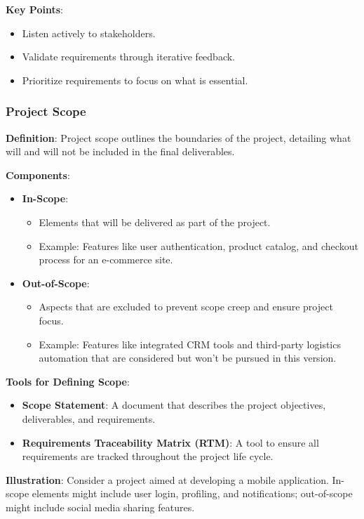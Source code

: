\documentclass[aspectratio=169]{beamer}
\begin{document}
\begin{frame}[fragile]
    \textbf{Key Points}:
    \begin{itemize}
        \item Listen actively to stakeholders.
        \item Validate requirements through iterative feedback.
        \item Prioritize requirements to focus on what is essential.
    \end{itemize}
\end{frame}

\begin{frame}[fragile]
    \frametitle{Project Scope}
    
    \textbf{Definition}:
    Project scope outlines the boundaries of the project, detailing what will and will not be included in the final deliverables.
    
    \textbf{Components}:
    \begin{itemize}
        \item \textbf{In-Scope}:
        \begin{itemize}
            \item Elements that will be delivered as part of the project.
            \item Example: Features like user authentication, product catalog, and checkout process for an e-commerce site.
        \end{itemize}
        
        \item \textbf{Out-of-Scope}:
        \begin{itemize}
            \item Aspects that are excluded to prevent scope creep and ensure project focus.
            \item Example: Features like integrated CRM tools and third-party logistics automation that are considered but won't be pursued in this version.
        \end{itemize}
    \end{itemize}
    
    \textbf{Tools for Defining Scope}:
    \begin{itemize}
        \item \textbf{Scope Statement}: A document that describes the project objectives, deliverables, and requirements.
        \item \textbf{Requirements Traceability Matrix (RTM)}: A tool to ensure all requirements are tracked throughout the project life cycle.
    \end{itemize}
    
    \textbf{Illustration}:
    Consider a project aimed at developing a mobile application. In-scope elements might include user login, profiling, and notifications; out-of-scope might include social media sharing features.
\end{frame}
\end{document}
